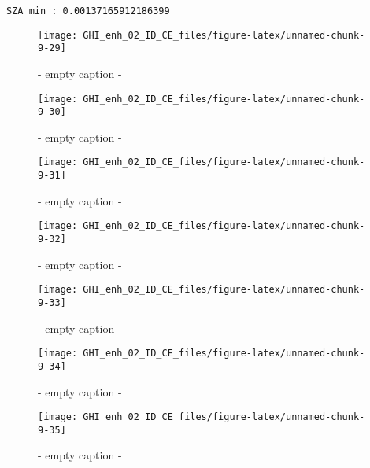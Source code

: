 \documentclass[
  10pt,
  a4paper,oneside]{article}
\begin{document}
\begin{verbatim}
SZA min : 0.00137165912186399 
\end{verbatim}

\begin{figure}[H]

{\centering \texttt{[image: GHI\_enh\_02\_ID\_CE\_files/figure-latex/unnamed-chunk-9-29]} 

}

\caption{ - empty caption - }\label{fig:unnamed-chunk-9-29}
\end{figure}
\begin{figure}[H]

{\centering \texttt{[image: GHI\_enh\_02\_ID\_CE\_files/figure-latex/unnamed-chunk-9-30]} 

}

\caption{ - empty caption - }\label{fig:unnamed-chunk-9-30}
\end{figure}
\begin{figure}[H]

{\centering \texttt{[image: GHI\_enh\_02\_ID\_CE\_files/figure-latex/unnamed-chunk-9-31]} 

}

\caption{ - empty caption - }\label{fig:unnamed-chunk-9-31}
\end{figure}
\begin{figure}[H]

{\centering \texttt{[image: GHI\_enh\_02\_ID\_CE\_files/figure-latex/unnamed-chunk-9-32]} 

}

\caption{ - empty caption - }\label{fig:unnamed-chunk-9-32}
\end{figure}
\begin{figure}[H]

{\centering \texttt{[image: GHI\_enh\_02\_ID\_CE\_files/figure-latex/unnamed-chunk-9-33]} 

}

\caption{ - empty caption - }\label{fig:unnamed-chunk-9-33}
\end{figure}
\begin{figure}[H]

{\centering \texttt{[image: GHI\_enh\_02\_ID\_CE\_files/figure-latex/unnamed-chunk-9-34]} 

}

\caption{ - empty caption - }\label{fig:unnamed-chunk-9-34}
\end{figure}
\begin{figure}[H]

{\centering \texttt{[image: GHI\_enh\_02\_ID\_CE\_files/figure-latex/unnamed-chunk-9-35]} 

}

\caption{ - empty caption - }\label{fig:unnamed-chunk-9-35}
\end{figure}
\end{document}

